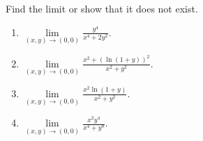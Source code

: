 Find the limit or show that it does not exist.

\begin{enumerate}
\item  \label{problem-lim-xytozero-(y^4)/(x^4+2y^2)} $\displaystyle \lim\limits_{(x,y)\to (0,0)}\frac{ y^4}{x^4+2y^2}$.


\item $\displaystyle \lim\limits_{(x,y)\to (0,0)} \frac{x^2+\left(\ln (1+y)\right)^2}{x^2+y^2}$.


\item $\displaystyle \lim\limits_{(x,y)\to (0,0)} \frac{x^2\ln (1+y)}{x^2+y^2}$.


\item $\displaystyle \lim\limits_{(x,y)\to (0,0)} \frac{x^2y^4}{x^4+y^8} .$


\end{enumerate}